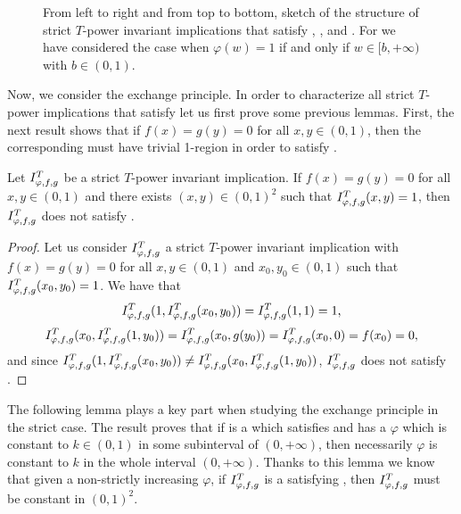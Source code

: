 \begin{figure}[t]
\begin{subfigure}[t]{.3\textwidth}
	\end{subfigure}%
	\caption[Schema of the structure of strict $T$-power invariant implications that satisfy \NP, \NPe, \IP and \OP]{From left to right and from top to bottom, sketch of the structure of strict $T$-power invariant implications that satisfy \NP, \NPe, \IP and \OP. For \IP we have considered the case when $\varphi(w)=1$ if and only if $w \in [b,+\infty)$ with $b \in (0,1)$.}
	\label{fig:strict:structure(NP),(IP),(OP)}
\end{figure}
Now, we consider the exchange principle. In order to characterize all strict $T$-power implications that satisfy \EP let us first prove some previous lemmas. First, the next result shows that if $f(x)=g(y)=0$ for all $x,y \in (0,1)$, then the corresponding \STP must have trivial 1-region in order to satisfy \EP.
\begin{lemma}\label{lem:strict:noreg1} Let $I^T_{\varphi,f,g}$ be a strict $T$-power invariant implication. If $f(x)=g(y)=0$ for all $x,y \in (0,1)$ and there exists $(x,y) \in (0,1)^2$ such that $I^T_{\varphi,f,g}(x,y)=1$, then $I^T_{\varphi,f,g}$ does not satisfy \EP.
\end{lemma}
\begin{proof} Let us consider $I^T_{\varphi,f,g}$ a strict $T$-power invariant implication with $f(x)=g(y)=0$ for all $x,y \in (0,1)$ and $x_0,y_0 \in (0,1)$ such that $I^T_{\varphi,f,g}(x_0,y_0)=1$. We have that
	$$ I^T_{\varphi,f,g}(1,I^T_{\varphi,f,g}(x_0,y_0))=I^T_{\varphi,f,g}(1,1)=1,$$
	$$ I^T_{\varphi,f,g}(x_0,I^T_{\varphi,f,g}(1,y_0)) = I^T_{\varphi,f,g}(x_0,g(y_0)) =I^T_{\varphi,f,g}(x_0,0)=f(x_0)=0,$$
	and since $I^T_{\varphi,f,g}(1,I^T_{\varphi,f,g}(x_0,y_0)) \not = I^T_{\varphi,f,g}(x_0,I^T_{\varphi,f,g}(1,y_0))$, $I^T_{\varphi,f,g}$ does not satisfy \EP.
\end{proof}
The following lemma plays a key part when studying the exchange principle in the strict case. The result proves that if \IT is a \STP which satisfies \EP and has a $\varphi$ which is constant to $k\in(0,1)$ in some subinterval of $(0,+\infty)$, then necessarily $\varphi$ is constant to $k$ in the whole interval $(0,+\infty)$. Thanks to this lemma we know that given a non-strictly increasing $\varphi$, if $I^T_{\varphi,f,g}$ is a \STP satisfying \EP, then $I^T_{\varphi,f,g}$ must be constant in $(0,1)^2$.
